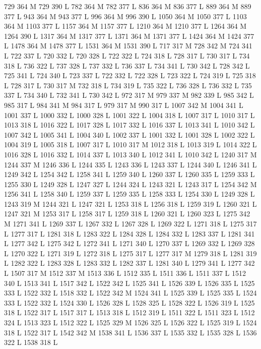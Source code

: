 {{{{{{{{{{{{{{{{{{729 364 M 729 390 L
782 364 M 782 377 L
836 364 M 836 377 L
889 364 M 889 377 L
943 364 M 943 377 L
996 364 M 996 390 L
1050 364 M 1050 377 L
1103 364 M 1103 377 L
1157 364 M 1157 377 L
1210 364 M 1210 377 L
1264 364 M 1264 390 L
1317 364 M 1317 377 L
1371 364 M 1371 377 L
1424 364 M 1424 377 L
1478 364 M 1478 377 L
1531 364 M 1531 390 L
717 317 M 728 342 M 724 341 L
722 337 L
720 332 L
720 328 L
722 322 L
724 318 L
728 317 L
730 317 L
734 318 L
736 322 L
737 328 L
737 332 L
736 337 L
734 341 L
730 342 L
728 342 L
725 341 L
724 340 L
723 337 L
722 332 L
722 328 L
723 322 L
724 319 L
725 318 L
728 317 L
730 317 M 732 318 L
734 319 L
735 322 L
736 328 L
736 332 L
735 337 L
734 340 L
732 341 L
730 342 L
972 317 M 979 337 M 982 339 L
985 342 L
985 317 L
984 341 M 984 317 L
979 317 M 990 317 L
1007 342 M 1004 341 L
1001 337 L
1000 332 L
1000 328 L
1001 322 L
1004 318 L
1007 317 L
1010 317 L
1013 318 L
1016 322 L
1017 328 L
1017 332 L
1016 337 L
1013 341 L
1010 342 L
1007 342 L
1005 341 L
1004 340 L
1002 337 L
1001 332 L
1001 328 L
1002 322 L
1004 319 L
1005 318 L
1007 317 L
1010 317 M 1012 318 L
1013 319 L
1014 322 L
1016 328 L
1016 332 L
1014 337 L
1013 340 L
1012 341 L
1010 342 L
1240 317 M 1244 337 M 1246 336 L
1244 335 L
1243 336 L
1243 337 L
1244 340 L
1246 341 L
1249 342 L
1254 342 L
1258 341 L
1259 340 L
1260 337 L
1260 335 L
1259 333 L
1255 330 L
1249 328 L
1247 327 L
1244 324 L
1243 321 L
1243 317 L
1254 342 M 1256 341 L
1258 340 L
1259 337 L
1259 335 L
1258 333 L
1254 330 L
1249 328 L
1243 319 M 1244 321 L
1247 321 L
1253 318 L
1256 318 L
1259 319 L
1260 321 L
1247 321 M 1253 317 L
1258 317 L
1259 318 L
1260 321 L
1260 323 L
1275 342 M 1271 341 L
1269 337 L
1267 332 L
1267 328 L
1269 322 L
1271 318 L
1275 317 L
1277 317 L
1281 318 L
1283 322 L
1284 328 L
1284 332 L
1283 337 L
1281 341 L
1277 342 L
1275 342 L
1272 341 L
1271 340 L
1270 337 L
1269 332 L
1269 328 L
1270 322 L
1271 319 L
1272 318 L
1275 317 L
1277 317 M 1279 318 L
1281 319 L
1282 322 L
1283 328 L
1283 332 L
1282 337 L
1281 340 L
1279 341 L
1277 342 L
1507 317 M 1512 337 M 1513 336 L
1512 335 L
1511 336 L
1511 337 L
1512 340 L
1513 341 L
1517 342 L
1522 342 L
1525 341 L
1526 339 L
1526 335 L
1525 333 L
1522 332 L
1518 332 L
1522 342 M 1524 341 L
1525 339 L
1525 335 L
1524 333 L
1522 332 L
1524 330 L
1526 328 L
1528 325 L
1528 322 L
1526 319 L
1525 318 L
1522 317 L
1517 317 L
1513 318 L
1512 319 L
1511 322 L
1511 323 L
1512 324 L
1513 323 L
1512 322 L
1525 329 M 1526 325 L
1526 322 L
1525 319 L
1524 318 L
1522 317 L
1542 342 M 1538 341 L
1536 337 L
1535 332 L
1535 328 L
1536 322 L
1538 318 L
}}}}}}}}}}}}}}}}}}
